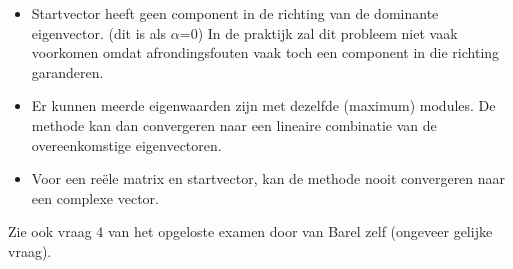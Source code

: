 \documentclass[examenvragen.tex]{subfiles}
\begin{document}
\begin{itemize}
\item Startvector heeft geen component in de richting van de dominante eigenvector. (dit is als $\alpha$=0) In de praktijk zal dit probleem niet vaak voorkomen omdat afrondingsfouten vaak toch een component in die richting garanderen.
\item Er kunnen meerde eigenwaarden zijn met dezelfde (maximum) modules. De methode kan dan convergeren naar een lineaire combinatie van de overeenkomstige eigenvectoren.
\item Voor een re\"ele matrix en startvector, kan de methode nooit convergeren naar een complexe vector.
\end{itemize}
Zie ook vraag 4 van het opgeloste examen door van Barel zelf (ongeveer gelijke vraag).
\fi


\end{document}
